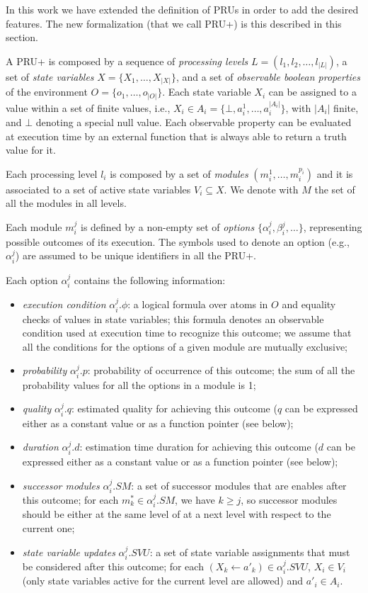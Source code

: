 In this work we have extended the definition of PRUs in order to add the desired features. The new formalization (that we call PRU+) is this described in this section.

A PRU+ is composed by a sequence of \emph{processing levels} $L = ( l_1, l_2, \ldots, l_{|L|})$, a set of \emph{state variables} $X = \{ X_1, \ldots, X_{|X|} \}$, and a set of \emph{observable boolean properties} of the environment $O = \{ o_1, \ldots, o_{|O|} \}$.
Each state variable $X_i$ can be assigned to a value within a set of finite values, i.e., $X_i \in A_i = \{ \bot , a_i^1, \ldots, a_i^{|A_i|} \}$, with $|A_i|$ finite, and $\bot$ denoting a special null value. Each observable property can be evaluated at execution time by an external function that is always able to return a truth value for it.

Each processing level $l_i$ is composed by a set of \emph{modules} $( m_i^1, \ldots, m_i^{p_i} )$ and it is associated to a set of active state variables $V_i \subseteq X$.
We denote with $M$ the set of all the modules in all levels.

Each module $m_i^j$ is defined by a non-empty set of \emph{options} $\{ \alpha_i^j, \beta_i^j, \ldots \}$, representing possible outcomes of its execution. The symbols used to denote an option (e.g., $\alpha_i^j$) are assumed to be unique identifiers in all the PRU+.

Each option $\alpha_i^j$ contains the following information:
\begin{itemize}
\item \emph{execution condition} $\alpha_i^j.\phi$: a logical formula over atoms in $O$ and equality checks of values in state variables; this formula denotes an observable condition used at execution time to recognize this outcome; we assume that all the conditions for the options of a given module are mutually exclusive;
\item \emph{probability} $\alpha_i^j.p$: probability of occurrence of this outcome; the sum of all the probability values for all the options in a module is 1;
\item \emph{quality} $\alpha_i^j.q$: estimated quality for achieving this outcome ($q$ can be expressed either as a constant value or as a function pointer (see below);
\item \emph{duration} $\alpha_i^j.d$: estimation time duration for achieving this outcome ($d$ can be expressed either as a constant value or as a function pointer (see below);
\item \emph{successor modules} $\alpha_i^j.SM$: a set of successor modules that are enables after this outcome; for each $m_k^* \in \alpha_i^j.SM$, we have $k \geq j$, so successor modules should be either at the same level of at a next level with respect to the current one;
\item \emph{state variable updates} $\alpha_i^j.SVU$: a set of state variable assignments that must be considered after this outcome; for each $(X_k \leftarrow a'_k) \in \alpha_i^j.SVU$, $X_i \in V_i$ (only state variables active for the current level are allowed) and  $a'_i \in A_i$.
\end{itemize}

